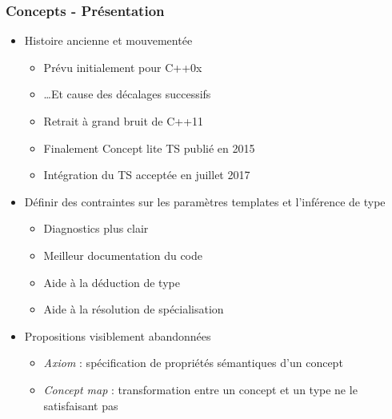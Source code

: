 \documentclass[C++.tex]{subfiles}
\begin{document}
\begin{frame}[fragile]
	\frametitle{Concepts - Présentation}
	\begin{itemize}
		\item Histoire ancienne et mouvementée
		\begin{itemize}
			\item Prévu initialement pour C++0x
			\item \ldots Et cause des décalages successifs
			\item Retrait à grand bruit de C++11
			\item Finalement Concept lite TS publié en 2015
			\item Intégration du TS acceptée en juillet 2017

		\end{itemize}
		\item Définir des contraintes sur les paramètres templates et l'inférence de type
		\begin{itemize}
			\item Diagnostics plus clair
			\item Meilleur documentation du code
			\item Aide à la déduction de type
			\item Aide à la résolution de spécialisation


		\end{itemize}
		\item Propositions visiblement abandonnées
		\begin{itemize}
			\item \textit{Axiom} : spécification de propriétés sémantiques d'un concept


			\item \textit{Concept map} : transformation entre un concept et un type ne le satisfaisant pas


		\end{itemize}
	\end{itemize}
\end{frame}
\end{document}
